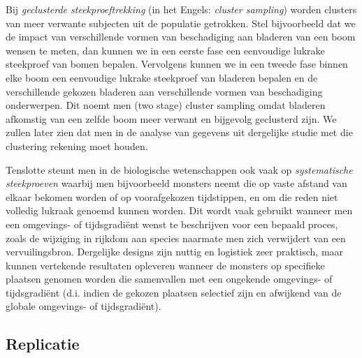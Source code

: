 \documentclass[
  12pt,dutch,coursenotes]{book}
\theoremstyle{definition}
\theoremstyle{definition}
\theoremstyle{definition}
\theoremstyle{definition}
\theoremstyle{remark}
\begin{document}
Bij \emph{geclusterde steekproeftrekking} (in het Engels: \emph{cluster sampling}) worden clusters van meer verwante subjecten uit de populatie getrokken. Stel bijvoorbeeld dat we de impact van verschillende vormen van beschadiging aan bladeren van een boom wensen te meten, dan kunnen we in een eerste fase een eenvoudige lukrake steekproef van bomen bepalen. Vervolgens kunnen we in een tweede fase binnen elke boom een eenvoudige lukrake steekproef van bladeren bepalen en de verschillende gekozen bladeren aan verschillende vormen van beschadiging onderwerpen. Dit noemt men (two stage) cluster sampling omdat bladeren afkomstig van een zelfde boom meer verwant en bijgevolg geclusterd zijn. We zullen later zien dat men in de analyse van gegevens uit dergelijke studie met die clustering rekening moet houden.

Tenslotte steunt men in de biologische wetenschappen ook vaak op \emph{systematische steekproeven} waarbij men bijvoorbeeld monsters neemt die op vaste afstand van elkaar bekomen worden of op voorafgekozen tijdstippen, en om die reden niet volledig lukraak genoemd kunnen worden. Dit wordt vaak gebruikt wanneer men een omgevings- of tijdsgradiënt wenst te beschrijven voor een bepaald proces, zoals de wijziging in rijkdom aan species naarmate men zich verwijdert van een vervuilingsbron. Dergelijke designs zijn nuttig en logistiek zeer praktisch, maar kunnen vertekende resultaten opleveren wanneer de monsters op specifieke plaatsen genomen worden die samenvallen met een ongekende omgevings- of tijdsgradiënt (d.i. indien de gekozen plaatsen selectief zijn en afwijkend van de globale omgevings- of tijdsgradiënt).

\hypertarget{replicatie}{%
\subsection{Replicatie}\label{replicatie}}
\end{document}
